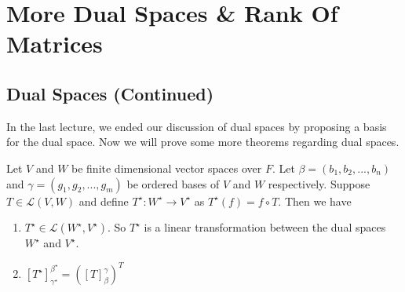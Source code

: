 \documentclass[main.tex]{subfiles}
\begin{document}
    \chapter{More Dual Spaces \& Rank Of Matrices}

    \section{Dual Spaces (Continued)}
    In the last lecture, we ended our discussion of dual spaces by proposing a basis for the dual space. Now we will prove some more theorems regarding dual spaces. 
    \begin{thrm}{}{}
        Let $V$ and $W$ be finite dimensional vector spaces over $F$. Let $\beta = (b_1, b_2, ..., b_n)$ and $\gamma = (g_1, g_2, ..., g_m)$ be ordered bases of $V$ and $W$ respectively. Suppose $T\in \mathcal{L}(V, W)$ and define $T^\star: W^\star \to V^\star$ as $T^\star (f) = f\circ T$. Then we have 
        \begin{enumerate}
            \item $T^\star \in \mathcal{L}(W^\star, V^\star)$. So $T^\star$ is a linear transformation between the dual spaces $W^\star$ and $V^\star$. 
            \item $[T^\star]_{\gamma^\star}^{\beta^\star} = \left( [T]_\beta^\gamma \right)^T$
        \end{enumerate}
    \end{thrm}
\end{document}

